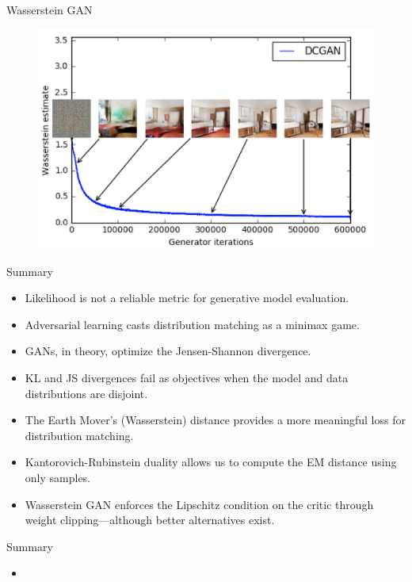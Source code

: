 \documentclass{beamer}
\begin{document}
\begin{frame}{Wasserstein GAN}
\begin{minipage}[t]{0.5\columnwidth}
\begin{figure}
		\end{figure}
	\end{minipage}%
	\begin{minipage}[t]{0.5\columnwidth}
		\begin{figure}
			\centering
			\includegraphics[width=0.95\linewidth]{figs/wgan_quality}
		\end{figure}
	\end{minipage}
\end{frame}
\begin{frame}{Summary}
	\begin{itemize}
		\item Likelihood is not a reliable metric for generative model evaluation.		
		\vfill
		\item Adversarial learning casts distribution matching as a minimax game.
		\vfill
		\item GANs, in theory, optimize the Jensen-Shannon divergence.
		\vfill
		\item KL and JS divergences fail as objectives when the model and data distributions are disjoint.
		\vfill
		\item The Earth Mover's (Wasserstein) distance provides a more meaningful loss for distribution matching.
		\vfill
		\item Kantorovich-Rubinstein duality allows us to compute the EM distance using only samples.
		\vfill
		\item Wasserstein GAN enforces the Lipschitz condition on the critic through weight clipping---although better alternatives exist.
	\end{itemize}
\end{frame}
\begin{frame}{Summary}
	\begin{itemize}
		\item
	\end{itemize}
\end{frame}
\end{document}
